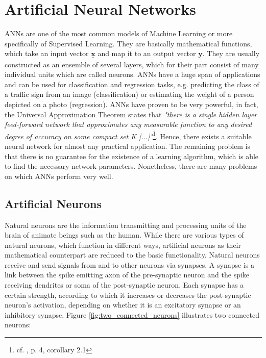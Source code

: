 \documentclass[11pt, a4paper]{article}
\newcommand\q[1]{\emph{"#1"}}
\newcommand\V[1]{\ensuremath{\underline{\mathbf{#1}}}}
\begin{document}
\section{Artificial Neural Networks}

\acp{ANN} are one of the most common models of Machine Learning or more specifically of Supervised Learning. They are basically mathematical functions, which take an input vector \V{x} and map it to an output vector \V{y}. They are usually constructed as an ensemble of several layers, which for their part consist of many individual units which are called neurons. \acp{ANN} have a huge span of applications and can be used for classification and regression tasks, e.g. predicting the class of a traffic sign from an image (classification) or estimating the weight of a person depicted on a photo (regression). \acp{ANN} have proven to be very powerful, in fact, the Universal Approximation Theorem states that \q{there is a single hidden layer feed-forward network that approximates any measurable function to any desired degree of accuracy on some compact set K [...]}\footnote{cf. \cite{uat}, p. 4, corollary 2.1}. Hence, there exists a suitable neural network for almost any practical application. The remaining problem is that there is no guarantee for the existence of a learning algorithm, which is able to find the necessary network parameters. Nonetheless, there are many problems on which \acp{ANN} perform very well.

\subsection{Artificial Neurons}

Natural neurons are the information transmitting and processing units of the brain of animate beings such as the human. While there are various types of natural neurons, which function in different ways, artificial neurons as their mathematical counterpart are reduced to the basic functionality. Natural neurons receive and send signals from and to other neurons via synapses. A synapse is a link between the spike emitting axon of the pre-synaptic neuron and the spike receiving dendrites or soma of the post-synaptic neuron. Each synapse has a certain strength, according to which it increases or decreases the post-synaptic neuron's activation, depending on whether it is an excitatory synapse or an inhibitory synapse. Figure \ref{fig:two_connected_neurons} illustrates two connected neurons:
\end{document}
